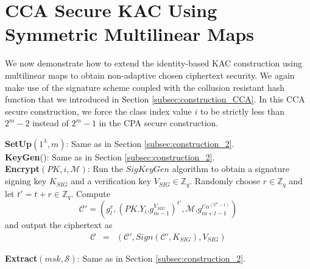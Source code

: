 \section{CCA Secure KAC Using Symmetric Multilinear Maps}
\label{app_sec:CCAsecure2}

We now demonstrate how to extend the identity-based KAC construction using multilinear maps to obtain non-adaptive chosen ciphertext security. We again make use of the signature scheme coupled with the collusion resistant hash function that we introduced in Section \ref{subsec:construction_CCA}. In this CCA secure construction, we force the class index value $i$ to be strictly less than $2^m-2$ instead of $2^m-1$ in the CPA secure construction.

\noindent\textbf{SetUp}$(1^{\lambda},m)$: Same as in Section \ref{subsec:construction_2}.\\
 
\noindent \textbf{KeyGen}(): Same as in Section \ref{subsec:construction_2}.\\
 
\noindent \textbf{Encrypt}$(PK,i,\mathcal{M})$: Run the $SigKeyGen$ algorithm to obtain a signature signing key $K_{SIG}$ and a verification key $V_{SIG} \in \mathbb{Z}_q$. Randomly choose $r\in\mathbb{Z}_q$ and let $t'=t+r \in\mathbb{Z}_q$. Compute 
\begin{equation}
 \mathcal{C}'=(g^r_{l},(PK.Y_i.g^{V_{SIG}}_{m-1})^{t'},\mathcal{M}.g^{t'\alpha^{(2^m-1)}}_{m+l-1})\nonumber
\end{equation} 
\noindent and output the ciphertext as
\begin{eqnarray}
 \mathcal{C}&=&(\mathcal{C}',Sign(\mathcal{C}',K_{SIG}),V_{SIG}) \nonumber
\end{eqnarray} 
 
\noindent \textbf{Extract}$(msk,\mathcal{S})$: Same as in Section \ref{subsec:construction_2}.\\
 
